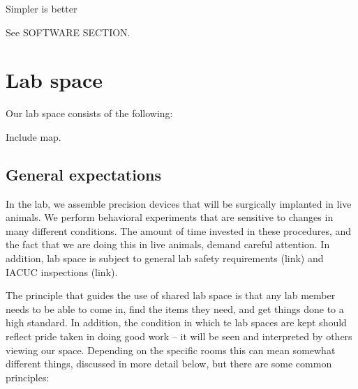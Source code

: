 \documentclass{tufte-book}
\begin{document}
Simpler is better

See SOFTWARE SECTION.


\chapter{Lab space}

Our lab space consists of the following:

Include map.

\section{General expectations}

In the lab, we assemble precision devices that will be surgically
implanted in live animals. We perform behavioral experiments that are
sensitive to changes in many different conditions. The amount of time
invested in these procedures, and the fact that we are doing this in
live animals, demand careful attention. In addition, lab space is
subject to general lab safety requirements (link) and IACUC
inspections (link).

The principle that guides the use of shared lab space is that any lab
member needs to be able to come in, find the items they need, and get
things done to a high standard. In addition, the condition in which te
lab spaces are kept should reflect pride taken in doing good work --
it will be seen and interpreted by others viewing our space.
Depending on the specific rooms this can mean somewhat different
things, discussed in more detail below, but there are some common
principles:
\end{document}
